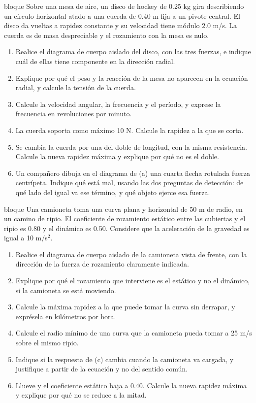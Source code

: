 \documentclass[11pt,openany]{book}
\begin{document}
\begin{ejercicio}{bloque}
Sobre una mesa de aire, un disco de hockey de 0.25 kg gira describiendo un círculo horizontal atado a una cuerda de 0.40 m fija a un pivote central. El disco da vueltas a rapidez constante y su velocidad tiene módulo 2.0 m/s. La cuerda es de masa despreciable y el rozamiento con la mesa es nulo.
\begin{enumerate}[label=(\alph*), leftmargin=1.7em, itemsep=1pt, topsep=3pt]
  \item Realice el diagrama de cuerpo aislado del disco, con las tres fuerzas, e indique cuál de ellas tiene componente en la dirección radial.
  \item Explique por qué el peso y la reacción de la mesa no aparecen en la ecuación radial, y calcule la tensión de la cuerda.
  \item Calcule la velocidad angular, la frecuencia y el período, y exprese la frecuencia en revoluciones por minuto.
  \item La cuerda soporta como máximo 10 N. Calcule la rapidez a la que se corta.
  \item Se cambia la cuerda por una del doble de longitud, con la misma resistencia. Calcule la nueva rapidez máxima y explique por qué no es el doble.
  \item Un compañero dibuja en el diagrama de (a) una cuarta flecha rotulada fuerza centrípeta. Indique qué está mal, usando las dos preguntas de detección: de qué lado del igual va ese término, y qué objeto ejerce esa fuerza.
\end{enumerate}
\end{ejercicio}

\begin{ejercicio}{bloque}
Una camioneta toma una curva plana y horizontal de 50 m de radio, en un camino de ripio. El coeficiente de rozamiento estático entre las cubiertas y el ripio es 0.80 y el dinámico es 0.50. Considere que la aceleración de la gravedad es igual a 10 m/s$^2$.
\begin{enumerate}[label=(\alph*), leftmargin=1.7em, itemsep=1pt, topsep=3pt]
  \item Realice el diagrama de cuerpo aislado de la camioneta vista de frente, con la dirección de la fuerza de rozamiento claramente indicada.
  \item Explique por qué el rozamiento que interviene es el estático y no el dinámico, si la camioneta se está moviendo.
  \item Calcule la máxima rapidez a la que puede tomar la curva sin derrapar, y exprésela en kilómetros por hora.
  \item Calcule el radio mínimo de una curva que la camioneta pueda tomar a 25 m/s sobre el mismo ripio.
  \item Indique si la respuesta de (c) cambia cuando la camioneta va cargada, y justifique a partir de la ecuación y no del sentido común.
  \item Llueve y el coeficiente estático baja a 0.40. Calcule la nueva rapidez máxima y explique por qué no se reduce a la mitad.
\end{enumerate}
\end{ejercicio}
\end{document}
